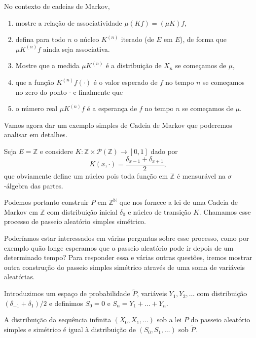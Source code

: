 \begin{topics}
\begin{exercise}
  No contexto de cadeias de Markov,
  \begin{enumerate}[\quad a)]
  \item mostre a relação de associatividade $\mu (K f) = (\mu K) f$,
  \item defina para todo $n$ o núcleo $K^{(n)}$ iterado (de $E$ em $E$), de forma que $\mu K^{(n)} f$ ainda seja associativa.
  \item Mostre que a medida $\mu K^{(n)}$ é a distribuição de $X_n$ se começamos de $\mu$,
  \item que a função $K^{(n)} f (\cdot)$ é o valor esperado de $f$ no tempo $n$ se começamos no zero do ponto $\cdot$ e finalmente que
  \item o número real $\mu K^{(n)} f$ é a esperança de $f$ no tempo $n$ se começamos de $\mu$.
  \end{enumerate}
\end{exercise}

Vamos agora dar um exemplo simples de Cadeia de Markov que poderemos analisar em detalhes.

Seja $E = \mathbb{Z}$ e considere $K: \mathbb{Z} \times \mathcal{P}(\mathbb{Z}) \to [0,1]$ dado por
\begin{equation}
  K(x, \cdot) = \frac{\delta_{x-1} + \delta_{x+1}}{2},
\end{equation}
que obviamente define um núcleo pois toda função em $\mathbb{Z}$ é mensurável na $\sigma$-álgebra das partes.

Podemos portanto construir $P$ em $\mathbb{Z}^{\mathbb{N}}$ que nos fornece a lei de uma Cadeia de Markov em $\mathbb{Z}$ com distribuição inicial $\delta_0$ e núcleo de transição $K$.
Chamamos esse processo de passeio aleatório simples simétrico. 

Poderíamos estar interessados em várias perguntas sobre esse processo, como por exemplo quão longe esperamos que o passeio aleatório pode ir depois de um determinado tempo?
Para responder essa e várias outras questões, iremos mostrar outra construção do passeio simples simétrico através de uma soma de variáveis aleatórias.

Introduzimos um espaço de probabilidade $\tilde P$, variáveis $Y_1, Y_2, \dots$ \iid com distribuição $(\delta_{-1} + \delta_{1})/2$ e definimos $S_0 = 0$ e $S_n = Y_1 + \dots + Y_n$.

\begin{lemma}
  A distribuição da sequência infinita $(X_0, X_1, \dots)$ sob a lei $P$ do passeio aleatório simples e simétrico é igual à distribuição de $(S_0, S_1, \dots)$ sob $\tilde P$.
\end{lemma}


\end{topics}
